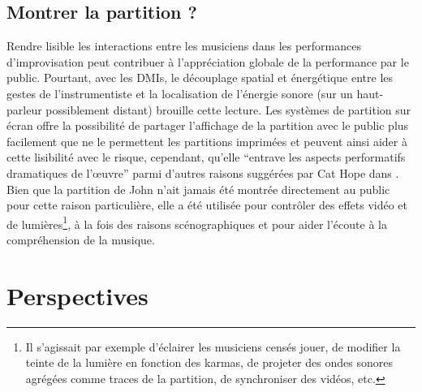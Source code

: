 \subsection{Montrer la partition ?}

\noindent Rendre lisible les interactions entre les musiciens dans les performances d'improvisation peut contribuer à l'appréciation globale de la performance par le public. Pourtant, avec les \glspl{DMI}, le découplage spatial et énergétique entre les gestes de l'instrumentiste et la localisation de l'énergie sonore (sur un haut-parleur possiblement distant) brouille cette lecture. Les systèmes de partition sur écran offre la possibilité de partager l'affichage de la partition avec le public plus facilement que ne le permettent les partitions imprimées et peuvent ainsi aider à cette lisibilité avec le risque, cependant, qu'elle ``entrave les aspects performatifs dramatiques de l'œuvre'' parmi d'autres raisons suggérées par Cat Hope dans \cite{hope_screen_2011}.\\
\indent Bien que la partition de John n'ait jamais été montrée directement au public pour cette raison particulière, elle a été utilisée pour contrôler des effets vidéo et de lumières\footnote{Il s'agissait par exemple d'éclairer les musiciens censés jouer, de modifier la teinte de la lumière en fonction des karmas, de projeter des ondes sonores agrégées comme traces de la partition, de synchroniser des vidéos, etc.}, à la fois des raisons scénographiques et pour aider l'écoute à la compréhension de la musique.

\section{Perspectives}

